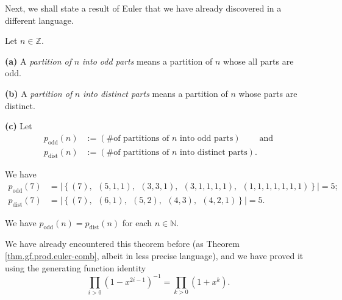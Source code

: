 Next, we shall state a result of Euler that we have already discovered in a
different language.

\begin{definition}
\label{def.pars.odd-dist-parts}Let $n\in\mathbb{Z}$. \medskip

\textbf{(a)} A \emph{partition of }$n$\emph{ into odd parts} means a partition
of $n$ whose all parts are odd. \medskip

\textbf{(b)} A \emph{partition of }$n$\emph{ into distinct parts} means a
partition of $n$ whose parts are distinct. \medskip

\textbf{(c)} Let%
\begin{align*}
p_{\operatorname*{odd}}\left(  n\right)   &  :=\left(  \text{\# of partitions
of }n\text{ into odd parts}\right)  \ \ \ \ \ \ \ \ \ \ \text{and}\\
p_{\operatorname*{dist}}\left(  n\right)   &  :=\left(  \text{\# of partitions
of }n\text{ into distinct parts}\right)  .
\end{align*}

\end{definition}

\begin{example}
We have%
\begin{align*}
p_{\operatorname*{odd}}\left(  7\right)   &  =\left\vert \left\{  \left(
7\right)  ,\ \ \left(  5,1,1\right)  ,\ \ \left(  3,3,1\right)  ,\ \ \left(
3,1,1,1,1\right)  ,\ \ \left(  1,1,1,1,1,1,1\right)  \right\}  \right\vert
=5;\\
p_{\operatorname*{dist}}\left(  7\right)   &  =\left\vert \left\{  \left(
7\right)  ,\ \ \left(  6,1\right)  ,\ \ \left(  5,2\right)  ,\ \ \left(
4,3\right)  ,\ \ \left(  4,2,1\right)  \right\}  \right\vert =5.
\end{align*}

\end{example}

\begin{theorem}
\label{thm.pars.odd-dist-equal}We have
$p_{\operatorname*{odd}}\left(  n\right)  =p_{\operatorname*{dist}}\left(
n\right)  $ for each $n\in\mathbb{N}$.
\end{theorem}

We have already encountered this theorem before (as Theorem
\ref{thm.gf.prod.euler-comb}, albeit in less precise language), and we have
proved it using the generating function identity%
\[
\prod_{i>0}\left(  1-x^{2i-1}\right)  ^{-1}=\prod_{k>0}\left(  1+x^{k}\right)
.
\]


